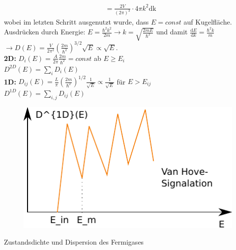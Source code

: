 \begin{itemize}
\begin{align}
            &= \frac{2V}{(2\pi)^3} \cdot 4 \pi k^2 \mathrm{dk}
        \end{align}
        wobei im letzten Schritt ausgenutzt wurde, dass $E = const$ auf Kugelfläche. \\
        Ausdrücken durch Energie: $ E = \frac{\hbar^2k^2}{2m} \rightarrow k = \sqrt{\frac{2mE}{\hbar^2}}$ und damit $ \frac{\mathrm{d}E}{\mathrm{d}k} = \frac{\hbar^2k}{m}$ \\
        $\rightarrow D(E) = \frac{V}{2\pi^2}\left(\frac{2m}{\hbar^2}\right)^{3/2}\sqrt{E} \propto \sqrt{E}$. \\
        \textbf{2D:} $D_i(E) = \frac{A}{2\pi}\frac{2m}{\hbar^2} = const $ ab $E \ge E_i$ \\
        $D^{2D}(E) = \sum_i D_i(E)$ \\
        \textbf{1D:} $D_{ij}(E) = \frac{L}{\pi}\left(\frac{2m}{\hbar^2}\right)^{1/2}\frac{1}{\sqrt{E}} \propto \frac{1}{\sqrt{E}} $ für $ E > E_{ij}$ \\
        $D^{1D}(E) = \sum_{i,j} D_{ij}(E)$
        \begin{figure}[H]
            \centering
            \includegraphics[]{figures/5_1zigzack.pdf}
            \caption{}
            \label{}
        \end{figure}
        
        Zustandsdichte und Dispersion des Fermigases


\end{itemize}
